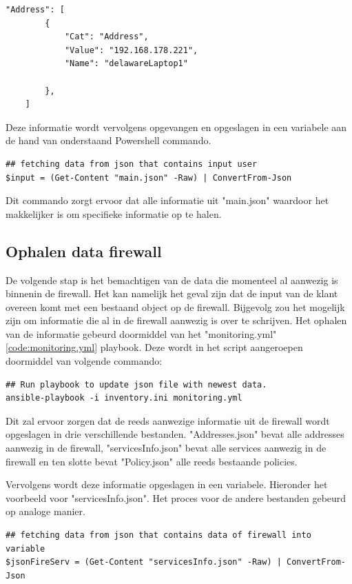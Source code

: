 \begin{lstlisting}[caption={main.json, voorbeeld input klant voor adres}]
     "Address": [
        {
            "Cat": "Address",
            "Value": "192.168.178.221",
            "Name": "delawareLaptop1"
            
        },
    ]

\end{lstlisting}
Deze informatie wordt vervolgens opgevangen en opgeslagen in een variabele aan de hand van onderstaand Powershell commando. 
\begin{lstlisting}
## fetching data from json that contains input user
$input = (Get-Content "main.json" -Raw) | ConvertFrom-Json
\end{lstlisting}
Dit commando zorgt ervoor dat alle informatie uit "main.json" waardoor het makkelijker is om specifieke informatie op te halen. 

\subsection{Ophalen data firewall}
\label{subsec:firewallData}
De volgende stap is het bemachtigen van de data die momenteel al aanwezig is binnenin de firewall. Het kan namelijk het geval zijn dat de input van de klant overeen komt met een bestaand object op de firewall. Bijgevolg zou het mogelijk zijn om informatie die al in de firewall aanwezig is over te schrijven. Het ophalen van de informatie gebeurd doormiddel van het "monitoring.yml" \ref{code:monitoring.yml} playbook. Deze wordt in het script aangeroepen doormiddel van volgende commando:

\begin{lstlisting}
## Run playbook to update json file with newest data.
ansible-playbook -i inventory.ini monitoring.yml
\end{lstlisting}
Dit zal ervoor zorgen dat de reeds aanwezige informatie uit de firewall wordt opgeslagen in drie verschillende bestanden. "Addresses.json" bevat alle addresses aanwezig in de firewall, "servicesInfo.json" bevat alle services aanwezig in de firewall en ten slotte bevat "Policy.json" alle reeds bestaande policies. 

Vervolgens wordt deze informatie opgeslagen in een variabele. Hieronder het voorbeeld voor "servicesInfo.json". Het proces voor de andere bestanden gebeurd op analoge manier. 
\begin{lstlisting}
## fetching data from json that contains data of firewall into variable
$jsonFireServ = (Get-Content "servicesInfo.json" -Raw) | ConvertFrom-Json
\end{lstlisting}
